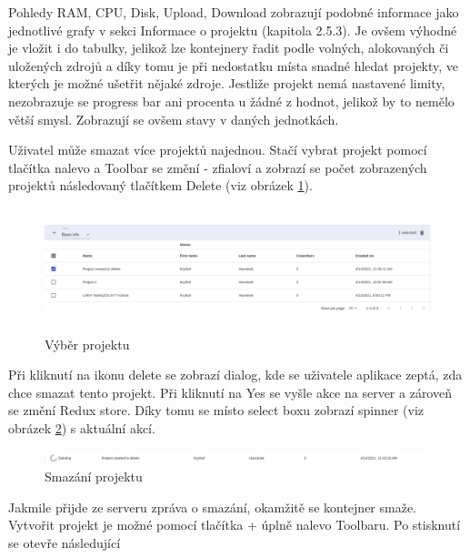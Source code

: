 \documentclass[a4paper,oneside,12pt]{report}
\begin{document}
Pohledy RAM, CPU, Disk, Upload, Download zobrazují podobné informace jako jednotlivé grafy v sekci Informace o projektu (kapitola 2.5.3).
Je ovšem výhodné je vložit i do tabulky, jelikož lze kontejnery řadit podle volných, alokovaných či uložených zdrojů a díky tomu je při nedostatku místa snadné hledat projekty, ve kterých je možné ušetřit nějaké zdroje.
Jestliže projekt nemá nastavené limity, nezobrazuje se progress bar ani procenta u žádné z hodnot, jelikož by to nemělo větší smysl. Zobrazují se ovšem stavy v daných jednotkách.

Uživatel může smazat více projektů najednou.
Stačí vybrat projekt pomocí tlačítka nalevo a Toolbar se změní - zfialoví a zobrazí se počet zobrazených projektů následovaný tlačítkem Delete (viz obrázek \ref{fig:projectSelect}).

\begin{figure}[h]
	\centering
	\includegraphics[height=3.6cm]{../img/project.png}
	\caption[Výběr projektu, vlastní tvorba]{Výběr projektu}
	\label{fig:projectSelect}
\end{figure}

Při kliknutí na ikonu delete se zobrazí dialog, kde se uživatele aplikace zeptá, zda chce smazat tento projekt.
Při kliknutí na Yes se vyšle akce na server a zároveň se změní Redux store. Díky tomu se místo select boxu zobrazí spinner (viz obrázek \ref{fig:detelePro}) s aktuální akcí.

\begin{figure}[h]
	\centering
	\includegraphics[height=0.35cm]{../img/deletingPro.png}
	\caption[Smazání projektu, vlastní tvorba]{Smazání projektu}
	\label{fig:detelePro}
\end{figure}

Jakmile přijde ze serveru zpráva o smazání, okamžitě se kontejner smaže.
Vytvořit projekt je možné pomocí tlačítka + úplně nalevo Toolbaru. Po stisknutí se otevře následující
\end{document}
